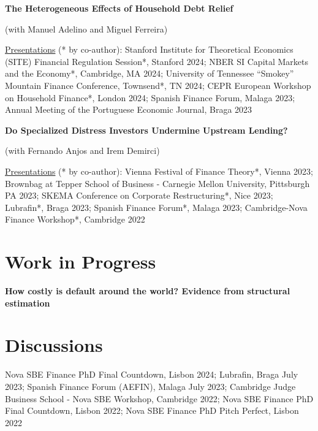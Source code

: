 \documentclass[letterpaper]{article}
\newenvironment{itemize*}{
  \begin{list}{}{
    \setlength{\leftmargin}{1.5em}
  }
}{
  \end{list}
}
\begin{document}
\begin{itemize*}
\item \textbf{The Heterogeneous Effects of Household Debt Relief}

	(with Manuel Adelino and Miguel Ferreira)
	
	\underline{Presentations} (* by co-author): Stanford Institute for Theoretical Economics (SITE) Financial Regulation Session*, Stanford 2024; NBER SI Capital Markets and the Economy*, Cambridge, MA 2024; University of Tennessee ``Smokey'' Mountain Finance Conference, Townsend*, TN 2024; CEPR European Workshop on Household Finance*, London 2024; Spanish Finance Forum, Malaga 2023; Annual Meeting of the Portuguese Economic Journal, Braga 2023
\medskip
	
\item \textbf{Do Specialized Distress Investors Undermine Upstream Lending?}

	(with Fernando Anjos and Irem Demirci)

	\underline{Presentations} (* by co-author): Vienna Festival of Finance Theory*, Vienna 2023; Brownbag at Tepper School of Business - Carnegie Mellon University, Pittsburgh PA 2023; SKEMA Conference on Corporate Restructuring*, Nice 2023; Lubrafin*, Braga 2023; Spanish Finance Forum*, Malaga 2023; Cambridge-Nova Finance Workshop*, Cambridge 2022
\end{itemize*}

\section*{Work in Progress}
\vspace{-0.2in}
\hrulefill

\begin{itemize*}
\item \textbf{How costly is default around the world? Evidence from structural estimation}
\end{itemize*}

\section*{Discussions}
\vspace{-0.2in}
\hrulefill
\begin{itemize*}
\item Nova SBE Finance PhD Final Countdown, Lisbon 2024; Lubrafin, Braga July 2023; Spanish Finance Forum (AEFIN), Malaga July 2023; Cambridge Judge Business School - Nova SBE Workshop,  Cambridge 2022; Nova SBE Finance PhD Final Countdown, Lisbon 2022; Nova SBE Finance PhD Pitch Perfect, Lisbon 2022
\end{itemize*}
\end{document}
